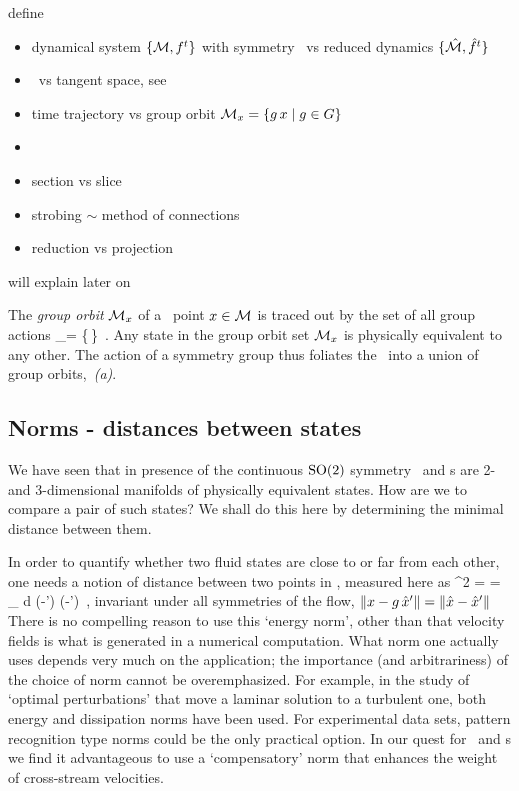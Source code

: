 define
\begin{itemize}
  \item dynamical system $\{{\cal M},f^t\}$ with symmetry \Group\
        vs reduced dynamics $\{\hat{\cal M},\hat{f}^t\}$
  \item \statesp\ vs tangent space, see 
  \item time trajectory \flowRed{\zeit}{\ssp} vs group orbit
        ${\cal M}_{x} = \{g\,x \mid g \in {\ensuremath{G}}\}$
  \item \template
  \item section {\PoincS} vs slice \pSRed
  \item strobing $\sim$ method of connections
  \item reduction vs projection
\end{itemize}
will explain later on
    \color{black}\fi

The \emph{group orbit} ${\cal M}_{x} $ of a \statesp\ point $x \in {\cal M}$ is
traced out by the set of all group actions
\beq
\pS_\ssp = \{\LieEl\,\ssp \mid \LieEl \in {\Group}\}
\,.
Any state in the  group orbit set ${\cal M}_{x}$
is physically equivalent to any other. The action of a symmetry group
thus foliates the \statesp\ into a union of group orbits,
\,{\it (a)}.

\subsection{Norms - distances between states}

We have seen that in presence of the continuous $\textrm{SO}(2)$ symmetry
\reqva\ and \rpo s are 2- and 3-dimensional manifolds of physically
equivalent states. How are we to compare a pair of such states? We shall
do this here by determining the minimal distance between them.

In order to quantify
whether two fluid states are close to or far from each other, one
needs a notion of distance between two points in \statesp, measured
here as
\beq
  ^2  =  =
\int_\bCell \! d \bx \;
(-\vec{u}') \cdot (-')
\,,
invariant under all symmetries of the flow,
$\|{x-g\,{\hat{x}'}}\|=\|{\hat{x}-{\hat{x}'}}\|$
There is no compelling reason to use this {`energy norm'}, other than
that velocity fields is what is generated in a numerical
computation. What norm one actually uses depends very much on the
application; the importance (and arbitrariness) of the choice of
norm cannot be overemphasized. For example, in the study of `optimal perturbations' that
move a laminar solution to a turbulent one, both energy
\citep{TeHaHe10} and dissipation \citep{LoCaCoPeGo11} norms have been
used.
For experimental data sets, pattern recognition type norms could be the
only practical option\rf{MakeThisUp}.
In our quest for \reqva\ and \rpo s we
find it advantageous to use a `compensatory' norm 
that enhances the weight of cross-stream velocities.


